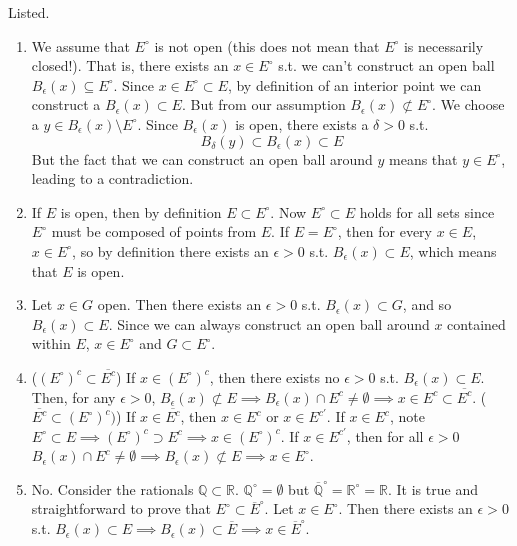   \begin{solution}
    Listed. 
    \begin{enumerate}
        \item We assume that $E^\circ$ is not open (this does not mean that $E^\circ$ is necessarily closed!). That is, there exists an $x \in E^\circ $ s.t. we can't construct an open ball $B_\epsilon (x) \subseteq E^\circ$. Since $x \in E^\circ \subset E$, by definition of an interior point we can construct a $B_\epsilon (x) \subset E$. But from our assumption $B_\epsilon (x) \not\subset E^\circ$. We choose a $y \in B_\epsilon (x) \setminus E^\circ$. Since $B_\epsilon (x)$ is open, there exists a $\delta > 0$ s.t. 
          \begin{equation}
            B_\delta (y) \subset B_\epsilon (x) \subset E
          \end{equation}
          But the fact that we can construct an open ball around $y$ means that $y \in E^\circ$, leading to a contradiction. 

        \item If $E$ is open, then by definition $E \subset E^\circ$. Now $E^\circ \subset E$ holds for all sets since $E^\circ$ must be composed of points from $E$. If $E = E^\circ$, then for every $x \in E$, $x \in E^\circ$, so by definition there exists an $\epsilon > 0$ s.t. $B_\epsilon (x) \subset E$, which means that $E$ is open. 

        \item Let $x \in G$ open. Then there exists an $\epsilon > 0$ s.t. $B_\epsilon (x) \subset G$, and so $B_\epsilon (x) \subset E$. Since we can always construct an open ball around $x$ contained within $E$, $x \in E^\circ$ and $G \subset E^\circ$. 

        \item ($(E^\circ)^c \subset \overline{E^c}$) If $x \in (E^\circ)^c$, then there exists no $\epsilon > 0$ s.t. $B_\epsilon (x) \subset E$. Then, for any $\epsilon > 0$, $B_\epsilon (x) \not\subset E \implies B_\epsilon (x) \cap E^c \neq \emptyset \implies x \in E^c \subset \overline{E^c}$. ($\overline{E^c} \subset (E^\circ)^c)$) If $x \in \overline{E^c}$, then $x \in E^c$ or $x \in E^{c \prime}$. If $x \in E^c$, note $E^\circ \subset E \implies (E^\circ)^c \supset E^c \implies x \in (E^\circ)^c$. If $x \in E^{c \prime}$, then for all $\epsilon > 0$ $B_\epsilon (x) \cap E^c \neq \emptyset \implies B_\epsilon (x) \not\subset E \implies x \in E^\circ$. 

        \item No. Consider the rationals $\mathbb{Q} \subset \mathbb{R}$. $\mathbb{Q}^\circ = \emptyset$ but $\overline{\mathbb{Q}}^\circ = \mathbb{R}^\circ = \mathbb{R}$. It is true and straightforward to prove that $E^\circ \subset \overline{E}^\circ$.  Let $x \in E^\circ$. Then there exists an $\epsilon > 0$ s.t. $B_\epsilon(x) \subset E \implies B_\epsilon (x) \subset \overline{E} \implies x \in \overline{E}^\circ$. 


\end{enumerate}
\end{solution}

